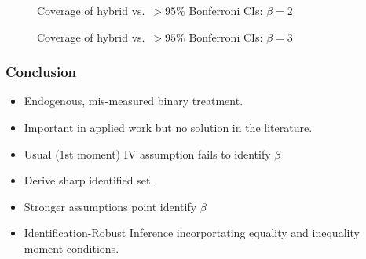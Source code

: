 \documentclass{beamer}
\begin{document}
\begin{frame}
\begin{figure}[h]
  \centering
\resizebox{0.75\textwidth}{!}{%
  
}
  
  \caption{Coverage of hybrid vs.\ $>95\%$ Bonferroni CIs: $\beta = 2$}
\end{figure}

\end{frame}
\begin{frame}
\begin{figure}[h]
  \centering
\resizebox{0.75\textwidth}{!}{%
  
}
  \caption{Coverage of hybrid vs.\ $>95\%$ Bonferroni CIs: $\beta = 3$}
  
\end{figure}

\end{frame}

\begin{frame}
  \frametitle{Conclusion}

  \begin{itemize}
    \item Endogenous, mis-measured binary treatment.
    \item Important in applied work but no solution in the literature.
      \item Usual (1st moment) IV assumption fails to identify $\beta$
    \item Derive sharp identified set.
      \item Stronger assumptions point identify $\beta$
      \item Identification-Robust Inference incorportating equality and inequality moment conditions.
   \end{itemize}

\end{frame}
\end{document}
